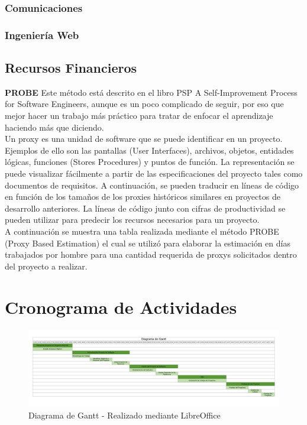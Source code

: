 \subsubsection*{Comunicaciones}

\subsubsection*{Ingenier\'ia Web}


\subsection{Recursos Financieros} 
\textbf{PROBE}
\newline
Este método est\'a descrito en el libro PSP A Self-Improvement Process for Software Engineers, aunque es un poco complicado de seguir, por eso que mejor hacer un trabajo m\'as pr\'actico para tratar de enfocar el aprendizaje haciendo m\'as que diciendo.\\

Un proxy es una unidad de software que se puede identificar en un proyecto. Ejemplos de ello son las pantallas (User Interfaces), archivos, objetos, entidades l\'ogicas, funciones (Stores Procedures) y puntos de funci\'on. La representaci\'on se puede visualizar f\'acilmente a partir de las especificaciones del proyecto tales como documentos de requisitos. A continuaci\'on, se pueden traducir en l\'ineas de c\'odigo en funci\'on de los tamaños de los proxies hist\'oricos similares en proyectos de desarrollo anteriores. La l\'ineas de c\'odigo junto con cifras de productividad se pueden utilizar para predecir los recursos necesarios para un proyecto.\\

A continuaci\'on se muestra una tabla realizada mediante el m\'etodo PROBE (Proxy Based Estimation) el cual se utiliz\'o para elaborar la estimaci\'on en d\'ias trabajados por hombre para una cantidad requerida de proxys solicitados dentro del proyecto a realizar.

\section{Cronograma de Actividades}
\begin{figure}[htb]
	\centering
	\includegraphics[width=1.2\linewidth]{capitulo4/img/Gantt.pdf}
	\caption{Diagrama de Gantt - Realizado mediante LibreOffice}
\end{figure}
